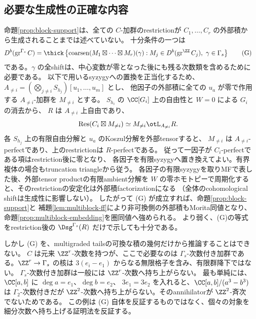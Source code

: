 \subsection{必要な生成性の正確な内容}

命題\ref{prop:block-support}は、全ての \(C\)-加群のrestrictionが
\(C_1,\ldots,C_r\) の外部積から生成されることまでは述べていない。
十分条件の一つは
\[
 D^b(\operatorname{gr}^{\Gamma_s}C)
 =\thick\left\{
 \operatorname{coarsen}(M_1\boxtimes\cdots\boxtimes M_r)(\gamma)
 :M_j\in D^b(\operatorname{gr}^{\ZZ}C_j),\ \gamma\in\Gamma_s
 \right\}
 \tag{G}\label{eq:block-generation}
\]
である。\(\gamma\) の全shiftは、中心変数が零となった後にも残る次数類を含めるために必要である。
以下で用いるsyzygyへの置換を正当化するため、
\(A_{\ne i}=(\bigotimes_{j\ne i}S_{h_j})[u_1,\ldots,u_m]\) とし、
他因子の外部積に全ての \(u_a\) が零で作用する \(A_{\ne i}\)-加群を \(M_{\ne i}\) とする。
\(S_{h_i}\) の \(\CC[G_i]\) 上の自由性と \(W=0\) による \(G_i\) の消去から、
\(R\) は \(A_{\ne i}\) 上自由であり、
\[
 \operatorname{Res}(C_i\boxtimes M_{\ne i})
 \simeq M_{\ne i}\otL_{A_{\ne i}}R.
\]
各 \(S_{h_j}\) 上の有限自由分解と \(u_a\) のKoszul分解を外部tensorすると、
\(M_{\ne i}\) は \(A_{\ne i}\)-perfectであり、上のrestrictionは \(R\)-perfectである。
従って一因子が \(C_i\)-perfectである項はrestriction後に零となり、
各因子を有限syzygyへ置き換えてよい。有界複体の場合もtruncation triangleから従う。
各因子の有限syzygyを取りMFで表した後、外部tensor productの有限ambient分解を
\(W\) の零ホモトピーで周期化すると、そのrestrictionの安定化は外部積factorizationになる
（全体のcohomological shiftは生成性に影響しない）。
したがって (G) が成立すれば、命題\ref{prop:block-support}と
補題\ref{lem:multiblock-ff}により非可換側の外部積もMorita同値となり、
命題\ref{prop:multiblock-embedding}を圏同値へ強められる。
より弱く、(G)の等式をrestriction後の \(\Dsg^{\Gamma_s}(R)\) だけで示しても十分である。

しかし (G) を、multigraded tailsの可換な積の幾何だけから推論することはできない。
\(C\) は元来 \(\ZZ^r\)-次数を持つが、ここで必要なのは
\(\Gamma_s\)-次数付き加群である。\(\ZZ^r\to\Gamma_s\) の核は
\(3(e_i-e_1)\) からなる無限格子を含み、有限群降下ではない。
\(\Gamma_s\)-次数付き加群は一般には \(\ZZ^r\)-次数へ持ち上がらない。
最も単純には、\(\CC[a,b]\) に \(\deg a=e_1\)、\(\deg b=e_2\)、
\(3e_1=3e_2\) を入れると、\(\CC[a,b]/(a^3-b^3)\) は \(\Gamma_2\)-次数付きだが
\(\ZZ^2\)-次数へ持ち上がらない。そのannihilatorが \(\ZZ^2\)-斉次でないためである。
この例は (G) 自体を反証するものではなく、個々の対象を細分次数へ持ち上げる証明法を反証する。

